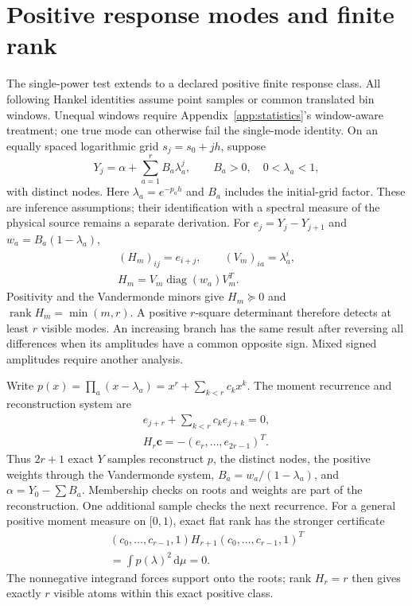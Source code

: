 \section{Positive response modes and finite rank}\label{sec:positive-modes}
The single-power test extends to a declared positive finite response class. All following Hankel identities assume point samples or common translated bin windows. Unequal windows require Appendix~\ref{app:statistics}'s window-aware treatment; one true mode can otherwise fail the single-mode identity.
On an equally spaced logarithmic grid $s_j=s_0+jh$, suppose
\begin{equation}
 Y_j=\alpha+\sum_{a=1}^r B_a\lambda_a^j,
 \qquad B_a>0,\quad 0<\lambda_a<1,
 \label{eq:positive-modes}
\end{equation}
with distinct nodes. Here $\lambda_a=e^{-p_a h}$ and $B_a$ includes the
initial-grid factor. These are inference assumptions; their identification
with a spectral measure of the physical source remains a separate derivation.
For $e_j=Y_j-Y_{j+1}$ and $w_a=B_a(1-\lambda_a)$,
\begin{equation}
 \begin{gathered}
 (H_m)_{ij}=e_{i+j},\qquad (V_m)_{ia}=\lambda_a^i,\\
 H_m=V_m\operatorname{diag}(w_a)V_m^T.
 \end{gathered}
 \label{eq:positive-hankel}
\end{equation}
Positivity and the Vandermonde minors give
$H_m\succeq0$ and $\operatorname{rank}H_m=\min(m,r)$.
A positive $r$-square determinant therefore detects at least $r$ visible
modes. An increasing branch has the same result after reversing all
differences when its amplitudes have a common opposite sign. Mixed signed
amplitudes require another analysis.

Write $p(x)=\prod_a(x-\lambda_a)=x^r+\sum_{k<r}c_kx^k$.
The moment recurrence and reconstruction system are
\begin{equation}
 \begin{gathered}
 e_{j+r}+\sum_{k<r}c_ke_{j+k}=0,\\
 H_r\bm c=-(e_r,\ldots,e_{2r-1})^T.
 \end{gathered}
 \label{eq:prony-system}
\end{equation}
Thus $2r+1$ exact $Y$ samples reconstruct $p$, the distinct nodes, the
positive weights through the Vandermonde system, $B_a=w_a/(1-\lambda_a)$,
and $\alpha=Y_0-\sum B_a$. Membership checks on roots and weights are part
of the reconstruction. One additional sample checks the next recurrence.
For a general positive moment measure on $[0,1)$, exact flat rank has the
stronger certificate
\begin{equation}
 \begin{gathered}
 (c_0,\ldots,c_{r-1},1)H_{r+1}(c_0,\ldots,c_{r-1},1)^T\\
 =\int p(\lambda)^2\,\mathrm d\mu=0.
 \end{gathered}
 \label{eq:flat-positive-rank}
\end{equation}
The nonnegative integrand forces support onto the roots; rank $H_r=r$
then gives exactly $r$ visible atoms within this exact positive class.

